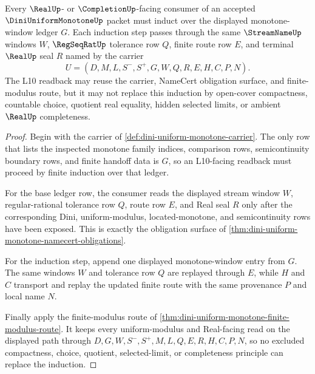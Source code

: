 \begin{theorem}\label{thm:dini-uniform-monotone-l10-readback-induction}
Every $\RealUp$- or $\CompletionUp$-facing consumer of an accepted $\DiniUniformMonotoneUp$ packet must induct over the displayed monotone-window ledger $G$. Each induction step passes through the same $\StreamNameUp$ windows $W$, $\RegSeqRatUp$ tolerance row $Q$, finite route row $E$, and terminal $\RealUp$ seal $R$ named by the carrier
$$
U=(D,M,L,S^{-},S^{+},G,W,Q,R,E,H,C,P,N).
$$
The L10 readback may reuse the carrier, NameCert obligation surface, and finite-modulus route, but it may not replace this induction by open-cover compactness, countable choice, quotient real equality, hidden selected limits, or ambient $\RealUp$ completeness.
\end{theorem}
\begin{proof}
Begin with the carrier of \autoref{def:dini-uniform-monotone-carrier}. The only row that lists the inspected monotone family indices, comparison rows, semicontinuity boundary rows, and finite handoff data is $G$, so an L10-facing readback must proceed by finite induction over that ledger.

For the base ledger row, the consumer reads the displayed stream window $W$, regular-rational tolerance row $Q$, route row $E$, and Real seal $R$ only after the corresponding Dini, uniform-modulus, located-monotone, and semicontinuity rows have been exposed. This is exactly the obligation surface of \autoref{thm:dini-uniform-monotone-namecert-obligations}.

For the induction step, append one displayed monotone-window entry from $G$. The same windows $W$ and tolerance row $Q$ are replayed through $E$, while $H$ and $C$ transport and replay the updated finite route with the same provenance $P$ and local name $N$.

Finally apply the finite-modulus route of \autoref{thm:dini-uniform-monotone-finite-modulus-route}. It keeps every uniform-modulus and Real-facing read on the displayed path through $D,G,W,S^{-},S^{+},M,L,Q,E,R,H,C,P,N$, so no excluded compactness, choice, quotient, selected-limit, or completeness principle can replace the induction.
\end{proof}


